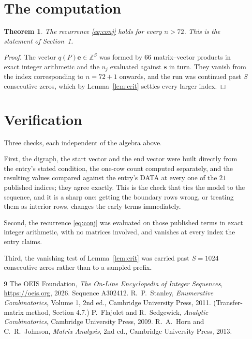 \documentclass[11pt,a4paper]{article}
\theoremstyle{plain}
\newtheorem{theorem}{Theorem}
\theoremstyle{definition}
\begin{document}
\section{The computation}

\begin{theorem}
The recurrence \eqref{eq:conj} holds for every $n>72$. This is the statement of
Section~1.
\end{theorem}

\begin{proof}
The vector $q(P)\mathbf{e}\in\mathbb{Z}^{S}$ was formed by $66$ matrix--vector
products in exact integer arithmetic and the $u_j$ evaluated against $\mathbf{s}$ in turn.
They vanish from the index corresponding to $n=72+1$ onwards, and the run was continued
past $S$ consecutive zeros, which by Lemma~\ref{lem:crit} settles every larger index.
\end{proof}

\section{Verification}

Three checks, each independent of the algebra above.

First, the digraph, the start vector and the end vector were built directly from the
entry's stated condition, the one-row count computed separately, and the resulting values
compared against the entry's DATA at every one of the $21$ published indices; they
agree exactly. This is the check that ties the model to the sequence, and it is a sharp one:
getting the boundary rows wrong, or treating them as interior rows, changes the early terms
immediately.

Second, the recurrence \eqref{eq:conj} was evaluated on those published terms in exact
integer arithmetic, with no matrices involved, and vanishes at every index the entry claims.

Third, the vanishing test of Lemma~\ref{lem:crit} was carried past $S=1024$ consecutive
zeros rather than to a sampled prefix.

\begin{thebibliography}{9}
 The OEIS Foundation, \emph{The On-Line Encyclopedia of Integer
Sequences}, \url{https://oeis.org}, 2026. Sequence A302412.
 R.~P.~Stanley, \emph{Enumerative Combinatorics}, Volume 1, 2nd ed.,
Cambridge University Press, 2011. (Transfer-matrix method, Section 4.7.)
 P.~Flajolet and R.~Sedgewick, \emph{Analytic Combinatorics}, Cambridge
University Press, 2009.
 R.~A.~Horn and C.~R.~Johnson, \emph{Matrix Analysis}, 2nd ed., Cambridge
University Press, 2013.
\end{thebibliography}
\end{document}
